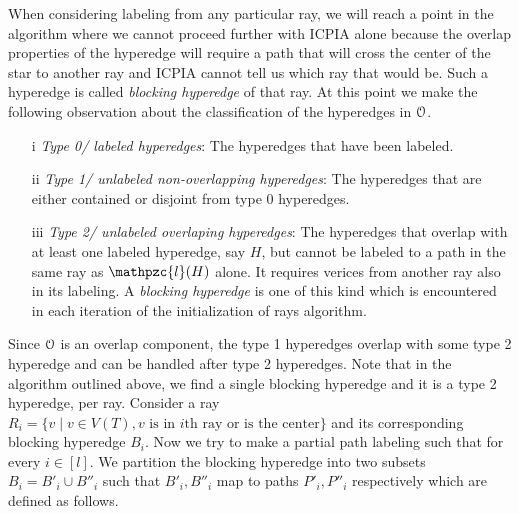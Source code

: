 \documentclass[a4paper,UKenglish,numberwithinsect]{lipics} %
\def\cO{{\cal O}}
\def\cl{\mathpzc{l}}
\begin{document}
\noindent
When considering labeling from any particular ray, we will reach a
point in the algorithm where we cannot proceed further with ICPIA
alone because the overlap properties of the hyperedge will require a
path that will cross the center of the star to another ray and ICPIA
cannot tell us which ray that would be. Such a hyperedge is called
{\em blocking hyperedge} of that ray. At this point we make the
following observation about the classification of the hyperedges in
$\cO$.
\begin{itemize}
\item[i] {\em Type 0/ labeled hyperedges}: The hyperedges that have been labeled.
\item[ii] {\em Type 1/ unlabeled non-overlapping hyperedges}: The hyperedges that are either contained or
  disjoint from type 0 hyperedges.
\item[iii] {\em Type 2/ unlabeled overlaping hyperedges}: The hyperedges that overlap with at least one
  labeled hyperedge, say $H$, but cannot be labeled to a path in the
  same ray as $\cl(H)$ alone. It requires verices from another ray
  also in its labeling. A {\em blocking hyperedge} is one of this kind
  which is encountered in each iteration of the initialization of rays algorithm.
\end{itemize}
\noindent
Since $\cO$ is an overlap component, the type 1 hyperedges overlap
with some type 2 hyperedge and can be handled after type 2
hyperedges. Note that in the algorithm outlined above, we find a single
blocking hyperedge and it is a type 2 hyperedge, per ray. Consider a
ray $R_i = \{v \mid v \in V(T), v \text{ is in $i$th ray or is the center}\}$ and its
corresponding blocking hyperedge $B_i$. Now we try
to make a partial path labeling such that for every $i \in [l]$. We partition the blocking
hyperedge into two subsets $B_i = B'_i \cup B''_i$ such that $B'_i,
B''_i$ map to paths $P'_i, P''_i$ respectively which are defined as
follows. 
\end{document}
